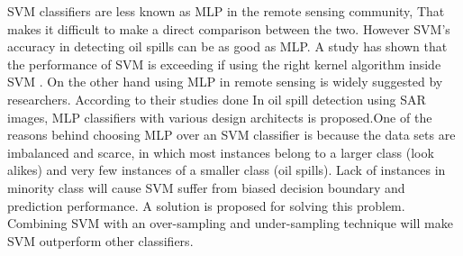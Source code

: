 


 
SVM classifiers are less known as MLP in the remote sensing community, That makes it difficult to make a direct comparison between the two. However SVM's accuracy in detecting oil spills can be as good as MLP. A study has shown that the performance of SVM is exceeding if using the right kernel algorithm inside SVM \cite{liu2006boosting}. On the other hand using MLP in remote sensing is widely suggested by researchers\cite{Mera201472,Brekke200595,fingas2014review}. According to their studies done In oil spill detection using SAR images, MLP classifiers with various design architects is proposed.One of the reasons behind choosing MLP over an SVM classifier is because the data sets are imbalanced and scarce, in which most instances belong to a larger class (look alikes) and very few instances of a smaller class (oil spills). Lack of instances in minority class will cause SVM suffer from biased decision boundary and prediction performance. A solution is proposed for solving this problem. 
Combining SVM with an over-sampling and under-sampling technique will make SVM outperform other classifiers\cite{liu2006boosting}.

